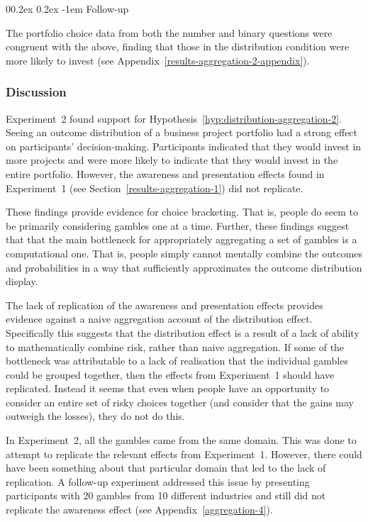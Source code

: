 \documentclass[
  english,
  man, donotrepeattitle,floatsintext]{apa7}
\makeatletter
\let\oldparagraph\paragraph
\renewcommand{\paragraph}[1]{\oldparagraph{#1}\mbox{}}
\renewcommand{\paragraph}{\@startsection{paragraph}{4}{\parindent}%
  {0\baselineskip \@plus 0.2ex \@minus 0.2ex}%
  {-1em}%
  {\normalfont\normalsize\bfseries\itshape\typesectitle}}
\theoremstyle{definition}
\theoremstyle{definition}
\theoremstyle{definition}
\theoremstyle{definition}
\theoremstyle{remark}
\makeatother
\begin{document}
\hypertarget{follow-up}{%
\paragraph{Follow-up}\label{follow-up}}

The portfolio choice data from both the number and binary questions were
congruent with the above, finding that those in the distribution condition were
more likely to invest (see Appendix~\ref{results-aggregation-2-appendix}).

\hypertarget{discussion-aggregation-4}{%
\subsubsection{Discussion}\label{discussion-aggregation-4}}

Experiment~2 found support for
Hypothesis~\ref{hyp:distribution-aggregation-2}. Seeing an outcome
distribution of a business project portfolio had a strong effect on
participants' decision-making. Participants indicated that they would invest in
more projects and were more likely to indicate that they would invest in the
entire portfolio. However, the awareness and presentation effects found in
Experiment~1 (see Section~\ref{results-aggregation-1}) did not replicate.

These findings provide evidence for choice bracketing. That is, people do seem
to be primarily considering gambles one at a time. Further, these findings
suggest that that the main bottleneck for appropriately aggregating a set of
gambles is a computational one. That is, people simply cannot mentally combine
the outcomes and probabilities in a way that sufficiently approximates the
outcome distribution display.

The lack of replication of the awareness and presentation effects provides
evidence against a naive aggregation account of the distribution effect.
Specifically this suggests that the distribution effect is a result of a lack of
ability to mathematically combine risk, rather than naive aggregation. If some
of the bottleneck was attributable to a lack of realisation that the individual
gambles could be grouped together, then the effects from Experiment~1 should
have replicated. Instead it seems that even when people have an opportunity to
consider an entire set of risky choices together (and consider that the gains
may outweigh the losses), they do not do this.

In Experiment~2, all the gambles came from the same domain. This was done to
attempt to replicate the relevant effects from Experiment~1. However, there
could have been something about that particular domain that led to the lack of
replication. A follow-up experiment addressed this issue by presenting
participants with 20 gambles from 10 different industries and still did not
replicate the awareness effect (see Appendix~\ref{aggregation-4}).
\end{document}
